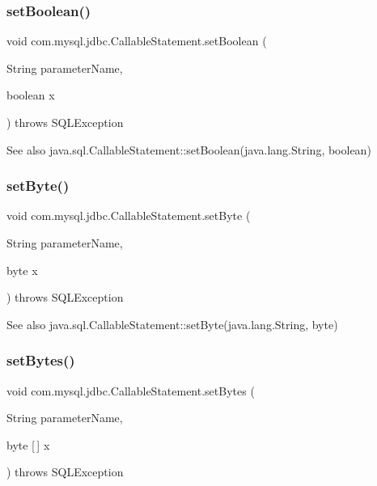 \subsubsection{\texorpdfstring{set\+Boolean()}{setBoolean()}}
{\footnotesize\ttfamily void com.\+mysql.\+jdbc.\+Callable\+Statement.\+set\+Boolean (\begin{DoxyParamCaption}\item[{String}]{parameter\+Name,  }\item[{boolean}]{x }\end{DoxyParamCaption}) throws S\+Q\+L\+Exception}

\begin{DoxySeeAlso}{See also}
java.\+sql.\+Callable\+Statement\+::set\+Boolean(java.\+lang.\+String, boolean) 
\end{DoxySeeAlso}
\mbox{\label{classcom_1_1mysql_1_1jdbc_1_1_callable_statement_af8225522ac95ef2dd99593ada6618c4c}} 
\subsubsection{\texorpdfstring{set\+Byte()}{setByte()}}
{\footnotesize\ttfamily void com.\+mysql.\+jdbc.\+Callable\+Statement.\+set\+Byte (\begin{DoxyParamCaption}\item[{String}]{parameter\+Name,  }\item[{byte}]{x }\end{DoxyParamCaption}) throws S\+Q\+L\+Exception}

\begin{DoxySeeAlso}{See also}
java.\+sql.\+Callable\+Statement\+::set\+Byte(java.\+lang.\+String, byte) 
\end{DoxySeeAlso}
\mbox{\label{classcom_1_1mysql_1_1jdbc_1_1_callable_statement_a8d7f8ce9e36f85ea08530f4261b59146}} 
\subsubsection{\texorpdfstring{set\+Bytes()}{setBytes()}}
{\footnotesize\ttfamily void com.\+mysql.\+jdbc.\+Callable\+Statement.\+set\+Bytes (\begin{DoxyParamCaption}\item[{String}]{parameter\+Name,  }\item[{byte \mbox{[}$\,$\mbox{]}}]{x }\end{DoxyParamCaption}) throws S\+Q\+L\+Exception}

